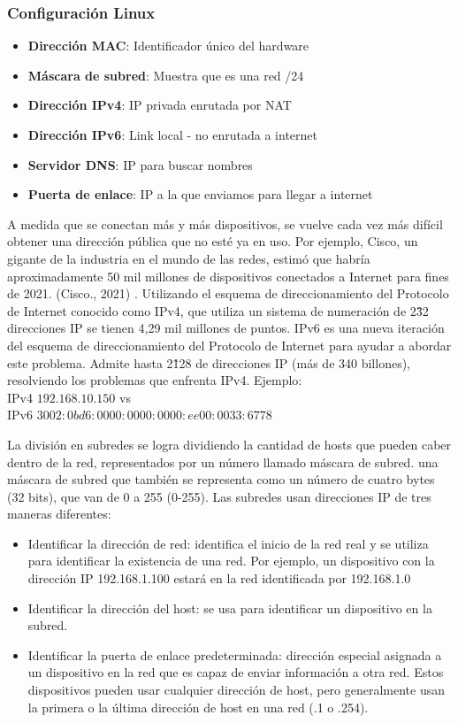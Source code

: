 \subsubsection{Configuración Linux}

\begin{itemize}
    \item \textbf{Dirección MAC}: Identificador único del hardware
    \item \textbf{Máscara de subred}: Muestra que es una red /24
    \item \textbf{Dirección IPv4}: IP privada enrutada por NAT
    \item \textbf{Dirección IPv6}: Link local - no enrutada a internet
    \item \textbf{Servidor DNS}: IP para buscar nombres
    \item \textbf{Puerta de enlace}: IP a la que enviamos para llegar a internet
\end{itemize}



A medida que se conectan más y más dispositivos, se vuelve cada vez más difícil obtener una dirección pública que no esté ya en uso. Por ejemplo, Cisco, un gigante de la industria en el mundo de las redes, estimó que habría aproximadamente 50 mil millones de dispositivos conectados a Internet para fines de 2021. (Cisco., 2021) . Utilizando el esquema de direccionamiento del Protocolo de Internet conocido como IPv4, que utiliza un sistema de numeración de 2\^32 direcciones IP se tienen 4,29 mil millones de puntos. 
IPv6 es una nueva iteración del esquema de direccionamiento del Protocolo de Internet para ayudar a abordar este problema. 
Admite hasta 2\^128 de direcciones IP (más de 340 billones), resolviendo los problemas que enfrenta IPv4. Ejemplo:\\
 IPv4 $192.168.10.150 $ vs  \\IPv6 $3002:0bd6:0000:0000:0000:ee00:0033:6778$


La división en subredes se logra dividiendo la cantidad de hosts que pueden caber dentro de la red, representados por un número llamado máscara de subred.  una máscara de subred que también se representa como un número de cuatro bytes (32 bits), que van de 0 a 255 (0-255). Las subredes usan direcciones IP de tres maneras diferentes:
\begin{itemize}
    \item Identificar la dirección de red: identifica el inicio de la red real y se utiliza para identificar la existencia de una red. Por ejemplo, un dispositivo con la dirección IP 192.168.1.100 estará en la red identificada por 192.168.1.0 
\item Identificar la dirección del host: se usa para identificar un dispositivo en la subred. 
\item Identificar la puerta de enlace predeterminada: dirección especial asignada a un dispositivo en la red que es capaz de enviar información a otra red. Estos dispositivos pueden usar cualquier dirección de host, pero generalmente usan la primera o la última dirección de host en una red (.1 o .254). 

\end{itemize}


